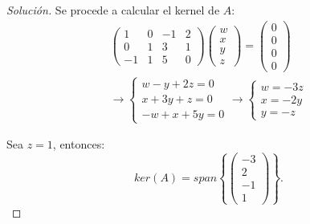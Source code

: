 \documentclass[12pt]{book}
\newenvironment{solucion}
  {\renewcommand\qedsymbol{$\square$}\begin{proof}[Solución]}
  {\end{proof}}
\begin{document}
\begin{solucion}
    Se procede a calcular el kernel de $A$:
    \begin{gather*}
        \begin{pmatrix}
        1 & 0 & -1 & 2\\
        0 & 1 & 3 & 1\\
        -1 & 1 & 5 & 0
        \end{pmatrix} 
        \begin{pmatrix}
            w\\
            x\\
            y\\
            z
        \end{pmatrix} 
        = \begin{pmatrix}
            0\\
            0\\
            0\\
            0
        \end{pmatrix}\\
        \rightarrow 
        \begin{cases}
            w-y+2z=0\\
            x+3y+z=0\\
            -w+x+5y=0
        \end{cases} \rightarrow \begin{cases}
            w=-3z\\
            x=-2y\\
            y=-z
        \end{cases}
    \end{gather*}
    
    Sea $z=1$, entonces:
    \[
    ker(A)=span\left\{\begin{pmatrix}
    -3\\
    2\\
    -1\\
    1
    \end{pmatrix}
    \right\}.
    \]
\end{solucion}
\end{document}
